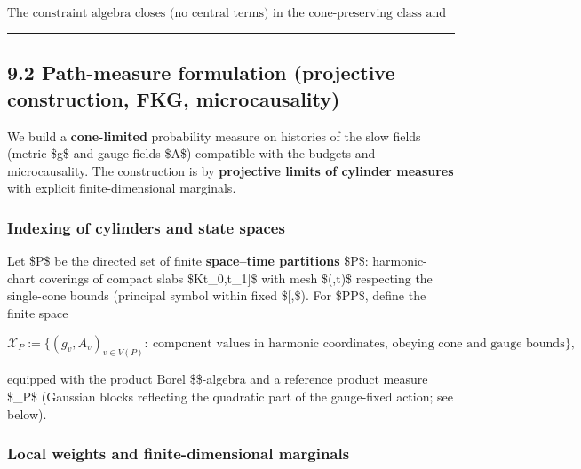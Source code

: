 \documentclass[
]{article}
\numberwithin{equation}{section}
\begin{document}
\[
\boxed{\text{The constraint algebra closes (no central terms) in the cone-preserving class and persists at the Γ-limit.}}
\tag{9.2}
\]

\begin{center}\rule{0.5\linewidth}{0.5pt}\end{center}

\hypertarget{path-measure-formulation-projective-construction-fkg-microcausality}{%
\subsection{9.2 Path-measure formulation (projective construction, FKG,
microcausality)}\label{path-measure-formulation-projective-construction-fkg-microcausality}}

We build a \textbf{cone-limited} probability measure on histories of the
slow fields (metric \$g\$ and gauge fields \$A\$) compatible with the
budgets and microcausality. The construction is by \textbf{projective
limits of cylinder measures} with explicit finite-dimensional marginals.

\hypertarget{indexing-of-cylinders-and-state-spaces}{%
\subsubsection{Indexing of cylinders and state
spaces}\label{indexing-of-cylinders-and-state-spaces}}

Let \$\mathscr P\$ be the directed set of finite \textbf{space--time
partitions} \$P\$: harmonic-chart coverings of compact slabs
\$K\times{[}t\_0,t\_1{]}\$ with mesh \$(\ell,\Delta t)\$ respecting the
single-cone bounds (principal symbol within fixed
\${[}\lambda,\Lambda{]}\$). For \$P\in\mathscr P\$, define the finite
space

\[
\mathcal X_P:=\{(g_v,A_v)_{v\in V(P)}:\ \text{component values in harmonic coordinates, obeying cone and gauge bounds}\},
\]

equipped with the product Borel \$\sigma\$-algebra and a reference
product measure \$\nu\_P\$ (Gaussian blocks reflecting the quadratic
part of the gauge-fixed action; see below).

\hypertarget{local-weights-and-finite-dimensional-marginals}{%
\subsubsection{Local weights and finite-dimensional
marginals}\label{local-weights-and-finite-dimensional-marginals}}
\end{document}
